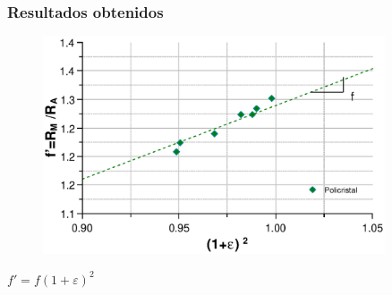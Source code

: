 \documentclass[usenames,dvipsnames]{beamer}
\begin{document}
\begin{frame}
 \frametitle{Resultados obtenidos}
 \begin{figure}
 \includegraphics[width=0.9\textwidth]{img/resistencia/PoliMono3.eps}
 \end{figure}
 \begin{center}
$f' = f (1+\varepsilon)^2$ 
\end{center}
 

\end{frame}
\end{document}
